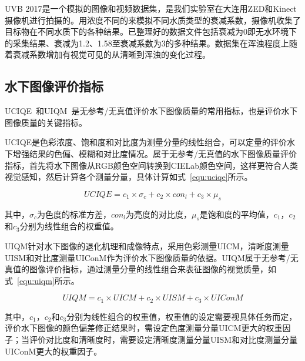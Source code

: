 UVB 2017是一个模拟的图像和视频数据集，是我们实验室在大连用ZED和Kinect摄像机进行拍摄的。用浓度不同的来模拟不同水质类型的衰减系数，摄像机收集了目标物在不同水质下的各种结果。已整理好的数据文件包括衰减为0即无水环境下的采集结果、衰减为1.2、1.58至衰减系数为3的多种结果。数据集在浑浊程度上随着衰减系数增加有视觉可见的从清晰到浑浊的变化过程。

\subsection{水下图像评价指标}
UCIQE~\cite{yang2015underwater}和UIQM~\cite{panetta2015human}是无参考/无真值评价水下图像质量的常用指标，也是评价水下图像质量的关键指标。

UCIQE是色彩浓度、饱和度和对比度为测量分量的线性组合，可以定量的评价水下增强结果的色偏、模糊和对比度情况。属于无参考/无真值的水下图像质量评价指标，首先将水下图像从RGB颜色空间转换到CIELab颜色空间，这样更符合人类视觉感知，然后计算各个测量分量，具体计算如式~\ref{equ:uciqe}所示。

\begin{equation}
\label{equ:uciqe}
UCIQE = c_1 \times \sigma_c + c_2 \times con_l + c_3 \times \mu_s
\end{equation}

其中，$ \sigma_c$为色度的标准方差，$con_l$为亮度的对比度，$\mu_s$是饱和度的平均值，$c_1$，$c_2$和$c_3$分别为线性组合的权重值。

UIQM针对水下图像的退化机理和成像特点，采用色彩测量UICM，清晰度测量UISM和对比度测量UIConM作为评价水下图像质量的依据。UIQM属于无参考/无真值的图像评价指标，通过测量分量的线性组合来表征图像的视觉质量，如式~\ref{equ:uiqm}所示。

\begin{equation}
\label{equ:uiqm}
UIQM = c_1 \times UICM + c_2 \times UISM + c_3 \times UIConM
\end{equation}

其中，$c_1$，$c_2$和$c_3$分别为线性组合的权重值，权重值的设定需要视具体任务而定，评价水下图像的颜色偏差修正结果时，需设定色度测量分量UICM更大的权重因子；当评价对比度和清晰度时，需要设定清晰度测量分量UISM和对比度测量分量UIConM更大的权重因子。



